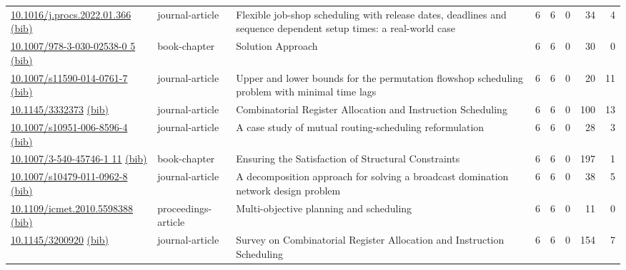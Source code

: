 {\begin{longtable}{p{5cm}lp{11cm}rrrrr}
\href{http://dx.doi.org/10.1016/j.procs.2022.01.366}{10.1016/j.procs.2022.01.366} \href{https://www.doi2bib.org/bib/10.1016/j.procs.2022.01.366}{(bib)} & journal-article & Flexible job-shop scheduling with release dates, deadlines and sequence dependent setup times: a real-world case & 6 & 6 & 0 & 34 & 4 \\
\href{http://dx.doi.org/10.1007/978-3-030-02538-0_5}{10.1007/978-3-030-02538-0 5} \href{https://www.doi2bib.org/bib/10.1007/978-3-030-02538-0_5}{(bib)} & book-chapter & Solution Approach & 6 & 6 & 0 & 30 & 0 \\
\href{http://dx.doi.org/10.1007/s11590-014-0761-7}{10.1007/s11590-014-0761-7} \href{https://www.doi2bib.org/bib/10.1007/s11590-014-0761-7}{(bib)} & journal-article & Upper and lower bounds for the permutation flowshop scheduling problem with minimal time lags & 6 & 6 & 0 & 20 & 11 \\
\href{http://dx.doi.org/10.1145/3332373}{10.1145/3332373} \href{https://www.doi2bib.org/bib/10.1145/3332373}{(bib)} & journal-article & Combinatorial Register Allocation and Instruction Scheduling & 6 & 6 & 0 & 100 & 13 \\
\href{http://dx.doi.org/10.1007/s10951-006-8596-4}{10.1007/s10951-006-8596-4} \href{https://www.doi2bib.org/bib/10.1007/s10951-006-8596-4}{(bib)} & journal-article & A case study of mutual routing-scheduling reformulation & 6 & 6 & 0 & 28 & 3 \\
\href{http://dx.doi.org/10.1007/3-540-45746-1_11}{10.1007/3-540-45746-1 11} \href{https://www.doi2bib.org/bib/10.1007/3-540-45746-1_11}{(bib)} & book-chapter & Ensuring the Satisfaction of Structural Constraints & 6 & 6 & 0 & 197 & 1 \\
\href{http://dx.doi.org/10.1007/s10479-011-0962-8}{10.1007/s10479-011-0962-8} \href{https://www.doi2bib.org/bib/10.1007/s10479-011-0962-8}{(bib)} & journal-article & A decomposition approach for solving a broadcast domination network design problem & 6 & 6 & 0 & 38 & 5 \\
\href{http://dx.doi.org/10.1109/icmet.2010.5598388}{10.1109/icmet.2010.5598388} \href{https://www.doi2bib.org/bib/10.1109/icmet.2010.5598388}{(bib)} & proceedings-article & Multi-objective planning and scheduling & 6 & 6 & 0 & 11 & 0 \\
\href{http://dx.doi.org/10.1145/3200920}{10.1145/3200920} \href{https://www.doi2bib.org/bib/10.1145/3200920}{(bib)} & journal-article & Survey on Combinatorial Register Allocation and Instruction Scheduling & 6 & 6 & 0 & 154 & 7 \\

\end{longtable}}
